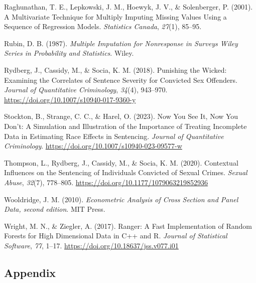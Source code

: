 \documentclass[
  letterpaper,
  DIV=11,
  numbers=noendperiod]{scrartcl}
\newlength{\cslhangindent}
\newlength{\cslentryspacingunit} %
\newenvironment{CSLReferences}[2] %
 {%
  \setlength{\parindent}{0pt}
  \ifodd #1
  \let\oldpar\par
  \def\par{\hangindent=\cslhangindent\oldpar}
  \fi
  \setlength{\parskip}{#2\cslentryspacingunit}
 }%
 {}
\begin{document}
\begin{CSLReferences}{1}{0}
\leavevmode{}%
Raghunathan, T. E., Lepkowski, J. M., Hoewyk, J. V., \& Solenberger, P.
(2001). A {Multivariate Technique} for {Multiply Imputing Missing Values
Using} a {Sequence} of {Regression Models}. \emph{Statistics Canada},
\emph{27}(1), 85--95.

\leavevmode{}%
Rubin, D. B. (1987). \emph{{Multiple Imputation for Nonresponse in
Surveys {\textbar} Wiley Series in Probability and Statistics}}.
{Wiley}.

\leavevmode{}%
Rydberg, J., Cassidy, M., \& Socia, K. M. (2018). Punishing the
{Wicked}: {Examining} the {Correlates} of {Sentence Severity} for
{Convicted Sex Offenders}. \emph{Journal of Quantitative Criminology},
\emph{34}(4), 943--970. \url{https://doi.org/10.1007/s10940-017-9360-y}

\leavevmode{}%
Stockton, B., Strange, C. C., \& Harel, O. (2023). Now You See It, Now
You Don{'}t: A Simulation and Illustration of the Importance of Treating
Incomplete Data in Estimating Race Effects in Sentencing. \emph{Journal
of Quantitative Criminology}.
\url{https://doi.org/10.1007/s10940-023-09577-w}

\leavevmode{}%
Thompson, L., Rydberg, J., Cassidy, M., \& Socia, K. M. (2020).
Contextual {Influences} on the {Sentencing} of {Individuals Convicted}
of {Sexual Crimes}. \emph{Sexual Abuse}, \emph{32}(7), 778--805.
\url{https://doi.org/10.1177/1079063219852936}

\leavevmode{}%
Wooldridge, J. M. (2010). \emph{Econometric {Analysis} of {Cross
Section} and {Panel Data}, second edition}. {MIT Press}.

\leavevmode{}%
Wright, M. N., \& Ziegler, A. (2017). Ranger: {A Fast Implementation} of
{Random Forests} for {High Dimensional Data} in {C}++ and {R}.
\emph{Journal of Statistical Software}, \emph{77}, 1--17.
\url{https://doi.org/10.18637/jss.v077.i01}

\end{CSLReferences}

\newpage

\hypertarget{appendix}{%
\subsection*{Appendix}\label{appendix}}
\end{document}
